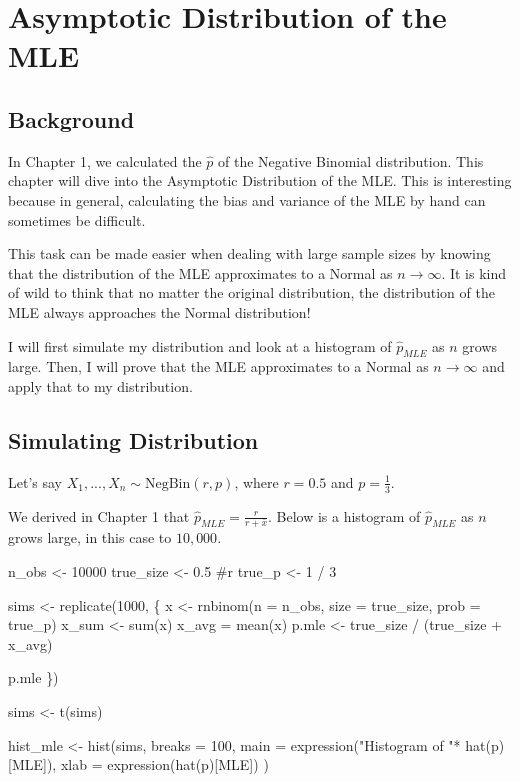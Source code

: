 \documentclass[
  letterpaper,
  DIV=11,
  numbers=noendperiod]{scrreprt}
\newenvironment{Shaded}{\begin{snugshade}}{\end{snugshade}}
\newcommand{\NormalTok}[1]{\textcolor[rgb]{0.00,0.23,0.31}{#1}}
\begin{document}

\chapter{Asymptotic Distribution of the
MLE}\label{asymptotic-distribution-of-the-mle}

\section{Background}\label{background-3}

In Chapter 1, we calculated the \(\hat{p}\) of the Negative Binomial
distribution. This chapter will dive into the Asymptotic Distribution of
the MLE. This is interesting because in general, calculating the bias
and variance of the MLE by hand can sometimes be difficult.

This task can be made easier when dealing with large sample sizes by
knowing that the distribution of the MLE approximates to a Normal as
\(n \rightarrow \infty\). It is kind of wild to think that no matter the
original distribution, the distribution of the MLE always approaches the
Normal distribution!

I will first simulate my distribution and look at a histogram of
\(\hat{p}_{MLE}\) as \(n\) grows large. Then, I will prove that the MLE
approximates to a Normal as \(n \rightarrow \infty\) and apply that to
my distribution.

\section{Simulating Distribution}\label{simulating-distribution}

Let's say \(X_1, ...,X_n \sim \text{NegBin}(r, p)\), where \(r=0.5\) and
\(p = \frac{1}{3}\).

We derived in Chapter 1 that \(\hat{p}_{MLE} = \frac{r}{r + \bar{x}}\).
Below is a histogram of \(\hat{p}_{MLE}\) as \(n\) grows large, in this
case to \(10,000\).

\begin{Shaded}
\begin{Highlighting}[]
\NormalTok{n\_obs \textless{}{-} 10000  }
\NormalTok{true\_size \textless{}{-} 0.5 \#r}
\NormalTok{true\_p \textless{}{-} 1 / 3}

\NormalTok{sims \textless{}{-} replicate(1000, \{}
\NormalTok{  x \textless{}{-} rnbinom(n = n\_obs, size = true\_size, prob = true\_p)}
\NormalTok{  x\_sum \textless{}{-} sum(x)}
\NormalTok{  x\_avg = mean(x)}
\NormalTok{  p.mle \textless{}{-} true\_size / (true\_size + x\_avg)}
  
\NormalTok{  p.mle}
\NormalTok{\})}

\NormalTok{sims \textless{}{-} t(sims)}

\NormalTok{hist\_mle \textless{}{-} hist(sims, }
\NormalTok{     breaks = 100, }
\NormalTok{     main = expression("Histogram of "* hat(p)[MLE]), }
\NormalTok{     xlab = expression(hat(p)[MLE])}
\NormalTok{)}
\end{Highlighting}
\end{Shaded}
\end{document}
